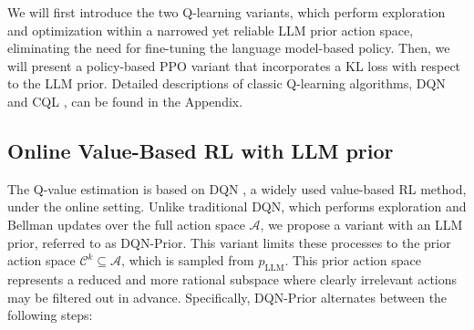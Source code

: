 \documentclass{article} %
\theoremstyle{plain}
\theoremstyle{definition}
\theoremstyle{remark}
\begin{document}
{We will first introduce the two Q-learning variants, which perform exploration and optimization within a narrowed yet reliable LLM prior action space, eliminating the need for fine-tuning the language model-based policy. Then, we will present a policy-based PPO variant that incorporates a KL loss with respect to the LLM prior. Detailed descriptions of classic Q-learning algorithms, DQN \cite{mnih2013playing} and CQL \cite{kumar2020conservative}, can be found in the Appendix.
\subsection{Online Value-Based RL with LLM prior} 
\label{sec: online_value_rl}
The Q-value estimation is based on DQN \citep{mnih2013playing}, a widely used value-based RL method, under the online setting. Unlike traditional DQN, which performs exploration and Bellman updates over the full action space $\mathcal{A}$, we propose a variant with an LLM prior, referred to as DQN-Prior. This variant limits these processes to the prior action space $\mathcal{C}^k \subseteq \mathcal{A}$, which is sampled from $p_\text{LLM}$. This prior action space represents a reduced and more rational subspace where clearly irrelevant actions may be filtered out in advance. Specifically, DQN-Prior alternates between the following steps:
}
\end{document}
